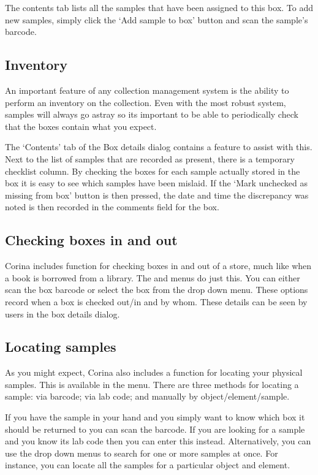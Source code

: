 The contents tab lists all the samples that have been assigned to this box.  To add new samples, simply click the `Add sample to box' button and scan the sample's barcode.  

\subsection{Inventory}
An important feature of any collection management system is the ability to perform an inventory on the collection.  Even with the most robust system, samples will always go astray so its important to be able to periodically check that the boxes contain what you expect.

The `Contents' tab of the Box details dialog contains a feature to assist with this.  Next to the list of samples that are recorded as present, there is a temporary checklist column.  By checking the boxes for each sample actually stored in the box it is easy to see which samples have been mislaid.  If the `Mark unchecked as missing from box' button is then pressed, the date and time the discrepancy was noted is then recorded in the comments field for the box.

\subsection{Checking boxes in and out}
Corina includes function for checking boxes in and out of a store, much like when a book is borrowed from a library.  The  and  menus do just this.  You can either scan the box barcode or select the box from the drop down menu.  These options record when a box is checked out/in and by whom.  These details can be seen by users in the box details dialog.

\subsection{Locating samples}
As you might expect, Corina also includes a function for locating your physical samples.  This is available in the  menu.  There are three methods for locating a sample: via barcode; via lab code; and manually by object/element/sample.  

If you have the sample in your hand and you simply want to know which box it should be returned to you can scan the barcode.  If you are looking for a sample and you know its lab code then you can enter this instead.  Alternatively, you can use the drop down menus to search for one or more samples at once.  For instance, you can locate all the samples for a particular object and element.


